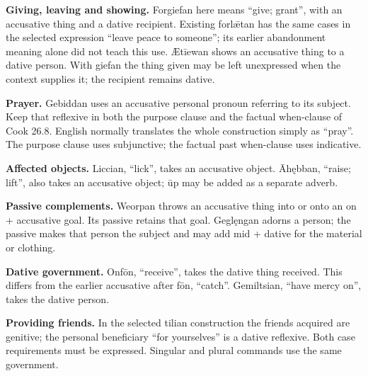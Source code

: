 \textbf{Giving, leaving and showing.} Forgiefan here means “give; grant”, with an accusative thing and a dative recipient. Existing forlǣtan has the same cases in the selected expression “leave peace to someone”; its earlier abandonment meaning alone did not teach this use. Ætīewan shows an accusative thing to a dative person. With giefan the thing given may be left unexpressed when the context supplies it; the recipient remains dative.

\textbf{Prayer.} Gebiddan uses an accusative personal pronoun referring to its subject. Keep that reflexive in both the purpose clause and the factual when-clause of Cook 26.8. English normally translates the whole construction simply as “pray”. The purpose clause uses subjunctive; the factual past when-clause uses indicative.

\textbf{Affected objects.} Liccian, “lick”, takes an accusative object. Āhębban, “raise; lift”, also takes an accusative object; ūp may be added as a separate adverb.

\textbf{Passive complements.} Weorpan throws an accusative thing into or onto an on + accusative goal. Its passive retains that goal. Geglęngan adorns a person; the passive makes that person the subject and may add mid + dative for the material or clothing.

\textbf{Dative government.} Onfōn, “receive”, takes the dative thing received. This differs from the earlier accusative after fōn, “catch”. Gemiltsian, “have mercy on”, takes the dative person.

\textbf{Providing friends.} In the selected tilian construction the friends acquired are genitive; the personal beneficiary “for yourselves” is a dative reflexive. Both case requirements must be expressed. Singular and plural commands use the same government.

